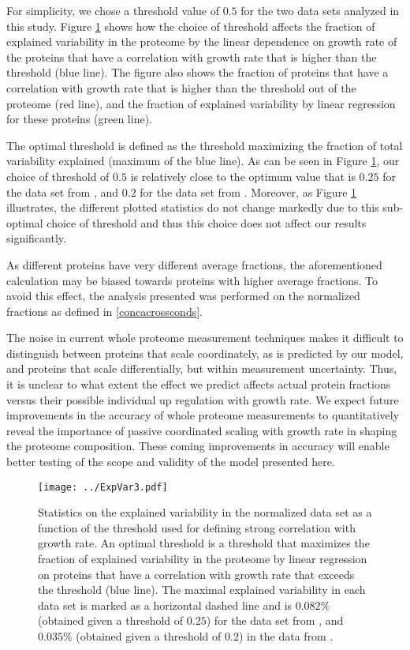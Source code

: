 \documentclass{article}
\newcommand{\hMaxExpVar}{0.082}
\newcommand{\vnMaxExpVar}{0.035}
\newcommand{\vMaxExpVar}{\vnMaxExpVar{}}
\begin{document}
For simplicity, we chose a threshold value of $0.5$ for the two data sets analyzed in this study.
Figure \ref{fig:threshold} shows how the choice of threshold affects the fraction of explained variability in the proteome by the linear dependence on growth rate of the proteins that have a correlation with growth rate that is higher than the threshold (blue line).
The figure also shows the fraction of proteins that have a correlation with growth rate that is higher than the threshold out of the proteome (red line), and the fraction of explained variability by linear regression for these proteins (green line).

The optimal threshold is defined as the threshold maximizing the fraction of total variability explained (maximum of the blue line).
As can be seen in Figure \ref{fig:threshold}, our choice of threshold of $0.5$ is relatively close to the optimum value that is $0.25$ for the data set from \cite{Heinemann2015}, and $0.2$ for the data set from \cite{Peebo_2015}.
Moreover, as Figure \ref{fig:threshold} illustrates, the different plotted statistics do not change markedly due to this sub-optimal choice of threshold and thus this choice does not affect our results significantly.

As different proteins have very different average fractions, the aforementioned calculation may be biased towards proteins with higher average fractions.
To avoid this effect, the analysis presented was performed on the normalized fractions as defined in \ref{concacrossconds}.

The noise in current whole proteome measurement techniques makes it difficult to distinguish between proteins that scale coordinately, as is predicted by our model, and proteins that scale differentially, but within measurement uncertainty.
Thus, it is unclear to what extent the effect we predict affects actual protein fractions versus their possible individual up regulation with growth rate.
We expect future improvements in the accuracy of whole proteome measurements to quantitatively reveal the importance of passive coordinated scaling with growth rate in shaping the proteome composition. These coming improvements in accuracy will enable better testing of the scope and validity of the model presented here.

\begin{figure}[H]
\begin{center}
\texttt{[image: ../ExpVar3.pdf]}
\caption{\label{fig:threshold}
  Statistics on the explained variability in the normalized data set as a function of the threshold used for defining strong correlation with growth rate.
  An optimal threshold is a threshold that maximizes the fraction of explained variability in the proteome by linear regression on proteins that have a correlation with growth rate that exceeds the threshold (blue line).
  The maximal explained variability in each data set is marked as a horizontal dashed line and is $\hMaxExpVar{}\%$ (obtained given a threshold of $0.25$) for the data set from \cite{Heinemann2015}, and $\vMaxExpVar{}\%$ (obtained given a threshold of $0.2$) in the data from \cite{Peebo_2015}.
%
}
\end{center}
\end{figure}
\end{document}
